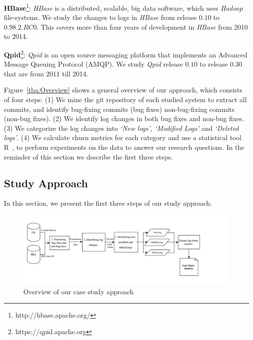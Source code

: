 {\textbf{HBase}\footnote[2]{http://hbase.apache.org/}}: \emph{HBase} is a distributed, scalable, big data software, which uses \emph{Hadoop} file-systems. We study the changes to logs in \emph{HBase} from release $0.10$ to $0.98.2.RC0$. This covers more than four years of development in \emph{HBase} from 2010 to 2014.

{\textbf{Qpid}\footnote[3]{https://qpid.apache.org}}: \emph{Qpid} is an open source messaging platform that implements an Advanced Message Queuing Protocol (AMQP). We study \emph{Qpid} release $0.10$ to release $0.30$ that are from 2011 till 2014.


Figure~\ref{tba:Overview} shows a general overview of our approach, which consists of four steps: (1) We mine the git repository of each studied system to extract all commits, and identify bug-fixing commits (bug fixes) non-bug-fixing commits (non-bug fixes). (2) We identify log changes in both bug fixes and non-bug fixes. (3) We categorize the log changes into \textsl{`New logs', `Modified Logs'} and \textsl{`Deleted logs'}. (4) We calculate churn metrics for each category and use a statistical tool R~\cite{ihaka1996r}, to perform experiments on the data to answer our research questions.  In the reminder of this section we describe the first three steps.



\subsection{Study Approach}

In this section, we present the first three steps of our study approach. 
\begin{figure}[t]
	\centering
	\includegraphics[scale=0.45]{MethdologyICESEM}
	\caption{Overview of our case study approach }
	\label{fig:MethodologyICSME}
\end{figure}

